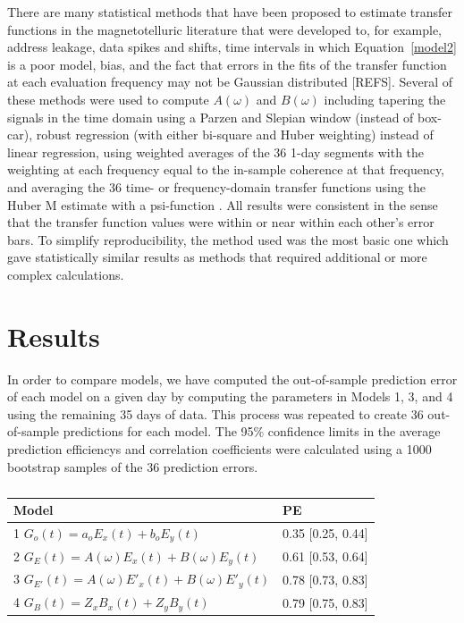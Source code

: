 \documentclass[draft,linenumbers]{agujournal2018}
\begin{document}
There are many statistical methods that have been proposed to estimate transfer functions in the magnetotelluric literature that were developed to, for example, address leakage, data spikes and shifts, time intervals in which Equation~\ref{model2} is a poor model, bias, and the fact that errors in the fits of the transfer function at each evaluation frequency may not be Gaussian distributed [REFS]. Several of these methods were used to compute $A(\omega)$ and $B(\omega)$ including tapering the signals in the time domain using a Parzen and Slepian window (instead of box-car), robust regression (with either bi-square and Huber weighting) instead of linear regression, using weighted averages of the 36 1-day segments with the weighting at each frequency equal to the in-sample coherence at that frequency, and averaging the 36 time- or frequency-domain transfer functions using the Huber M estimate with a psi-function \citep{Huber2011}. All results were consistent in the sense that the transfer function values were within or near within each other's error bars. To simplify reproducibility, the method used was the most basic one which gave statistically similar results as methods that required additional or more complex calculations.

\section{Results}

In order to compare models, we have computed the out-of-sample prediction error of each model on a given day by computing the parameters in Models 1, 3, and 4 using the remaining 35 days of data. This process was repeated to create 36 out-of-sample predictions for each model. The 95\% confidence limits in the average prediction efficiencys and correlation coefficients were calculated using a 1000 bootstrap samples of the 36 prediction errors.

\begin{table}
\caption{}
\centering
\begin{tabular}{l l}
\hline
Model & PE  \\
\hline
1\hspace{1em} $G_o(t) = a_oE_x(t) + b_oE_y(t)$ & 0.35 [0.25, 0.44] \\
2\hspace{1em} $G_E(t) = A(\omega)E_x(t) + B(\omega)E_y(t)$ & 0.61 [0.53, 0.64] \\
3\hspace{1em} $G_{E'}(t) = A(\omega)E'_x(t) + B(\omega)E'_y(t)$ & 0.78 [0.73, 0.83] \\
4\hspace{1em} $G_{B}(t) = Z_xB_x(t) + Z_yB_y(t)$ & 0.79 [0.75, 0.83] \\
\hline
\end{tabular}
\end{table}
\end{document}
